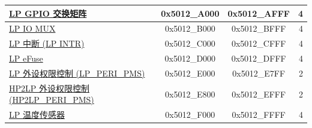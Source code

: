 \begin{ThreePartTable}
\begin{longtable}[c]{ |p{7cm}|c|c|r| }
\hyperref[mod:iomuxgpio]{LP GPIO 交换矩阵}          & 0x5012\_A000 & 0x5012\_AFFF &   4 \\\hline
\hyperref[mod:iomuxgpio]{LP IO MUX}                & 0x5012\_B000 & 0x5012\_BFFF &   4 \\\hline
\hyperref[mod:ulp]{LP 中断 (LP INTR)}        & 0x5012\_C000 & 0x5012\_CFFF &   4 \\\hline
\hyperref[mod:efuse]{LP eFuse}                    & 0x5012\_D000 & 0x5012\_DFFF &   4 \\\hline
\hyperref[mod:permctrl]{LP 外设权限控制 (LP\_PERI\_PMS)}                 & 0x5012\_E000 & 0x5012\_E7FF &   2 \\\hline
\hyperref[mod:permctrl]{HP2LP 外设权限控制 (HP2LP\_PERI\_PMS)}            & 0x5012\_E800 & 0x5012\_EFFF &   2 \\\hline
\hyperref[mod:tmpsen]{LP 温度传感器}         & 0x5012\_F000 & 0x5012\_FFFF &   4 \\\hline
\end{longtable}
\end{ThreePartTable}

